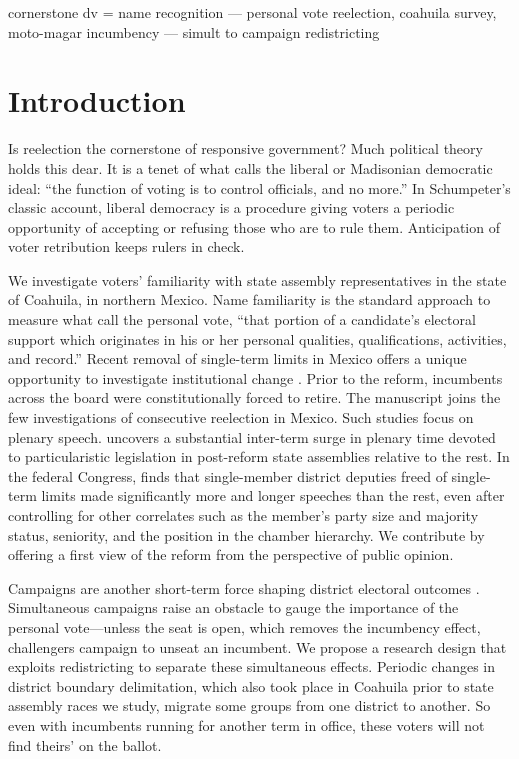 
cornerstone
dv = name recognition --- personal vote
reelection, coahuila
survey, moto-magar
incumbency --- simult to campaign
redistricting

\section{Introduction}

Is reelection the cornerstone of responsive government? Much political theory holds this dear. It is a tenet of what \citet[][:9]{riker.lib.pop.1978} calls the liberal or Madisonian democratic ideal: ``the function of voting is to control officials, and no more.'' In Schumpeter's \citeyearpar{schumpeter.1942} classic account, liberal democracy is a procedure giving voters a periodic opportunity of accepting or refusing those who are to rule them. Anticipation of voter retribution keeps rulers in check. 


We investigate voters' familiarity with state assembly representatives in the state of Coahuila, in northern Mexico. Name familiarity is the standard approach to measure what \citet[][:9]{cain.etal.1987} call the personal vote, ``that portion of a candidate's electoral support which originates in his or her personal qualities, qualifications, activities, and record.'' Recent removal of single-term limits in Mexico offers a unique opportunity to investigate institutional change \citep[see][]{magarInstReel.2017}. Prior to the reform, incumbents across the board were constitutionally forced to retire. The manuscript joins the few investigations of consecutive reelection in Mexico. Such studies focus on plenary speech. \citet{motolinia-reel-pork2021} uncovers a substantial inter-term surge in plenary time devoted to particularistic legislation in post-reform state assemblies relative to the rest. In the federal Congress, \citet{magar.debate.2021} finds that single-member district deputies freed of single-term limits made significantly more and longer speeches than the rest, even after controlling for other correlates such as the member's party size and majority status, seniority, and the position in the chamber hierarchy. We contribute by offering a first view of the reform from the perspective of public opinion.

Campaigns are another short-term force shaping district electoral outcomes \citep{moreno.decisElec.2009,downs.1957,jacobson.1990spending,popkin.1991}. Simultaneous campaigns raise an obstacle to gauge the importance of the personal vote---unless the seat is open, which removes the incumbency effect, challengers campaign to unseat an incumbent. We propose a research design that exploits redistricting to separate these simultaneous effects. Periodic changes in district boundary delimitation, which also took place in Coahuila prior to state assembly races we study, migrate some groups from one district to another. So even with incumbents running for another term in office, these voters will not find theirs' on the ballot. 

